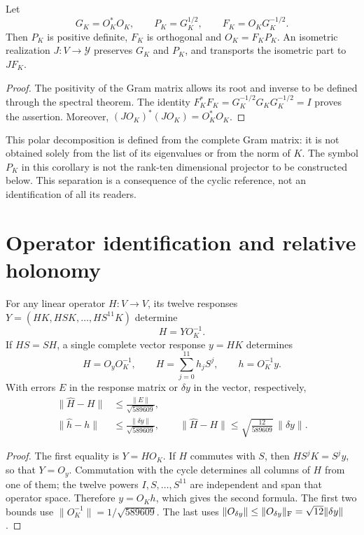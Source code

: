 \begin{corollary}
\label{x_reciprocidad:lib01:polar}
Let
\[
 G_K=O_K^*O_K,\qquad P_K=G_K^{1/2},\qquad
 F_K=O_KG_K^{-1/2}.
\]
Then \(P_K\) is positive definite, \(F_K\) is orthogonal and
\(O_K=F_KP_K\). An isometric realization \(J:V\to\mathcal Y\)
preserves \(G_K\) and \(P_K\), and transports the isometric part to
\(JF_K\).
\end{corollary}
\begin{proof}
The positivity of the Gram matrix allows its root and inverse to be defined through the
spectral theorem. The identity
\(F_K^*F_K=G_K^{-1/2}G_KG_K^{-1/2}=I\) proves the assertion.
Moreover, \((JO_K)^*(JO_K)=O_K^*O_K\).
\end{proof}

This polar decomposition is defined from the complete Gram matrix: it is not obtained solely from the list of its eigenvalues or from the norm of \(K\). The symbol \(P_K\) in this corollary is not the rank-ten dimensional projector to be constructed below. This separation is a consequence of the cyclic reference, not an identification of all its readers.

\section{Operator identification and relative holonomy}
\label{x_reciprocidad:lib01:identificacion}

\begin{theorem}
\label{x_reciprocidad:lib01:operadores}
For any linear operator \(H:V\to V\), its twelve responses \(Y=(HK,HSK,\ldots,HS^{11}K)\) determine
\[
 H=YO_K^{-1}.
\]
If \(HS=SH\), a single complete vector response \(y=HK\)
determines
\begin{equation}
 H=O_yO_K^{-1},\qquad
 H=\sum_{j=0}^{11}h_jS^j,\qquad h=O_K^{-1}y.
 \label{x_reciprocidad:lib01:filtro}
\end{equation}
With errors \(E\) in the response matrix or \(\delta y\) in the vector, respectively,
\begin{align}
 \|\widehat H-H\|&\leq\frac{\|E\|}{\sqrt{589609}},
 \label{x_reciprocidad:lib01:error-matriz}\\
 \|\widehat h-h\|&\leq\frac{\|\delta y\|}{\sqrt{589609}},\qquad
 \|\widehat H-H\|\leq\sqrt{\frac{12}{589609}}\,\|\delta y\|.
 \label{x_reciprocidad:lib01:error-filtro}
\end{align}
\end{theorem}
\begin{proof}
The first equality is \(Y=HO_K\). If \(H\) commutes with \(S\),
then \(HS^jK=S^jy\), so that \(Y=O_y\). Commutation with
the cycle determines all columns of \(H\) from one of them;
the twelve powers \(I,S,\ldots,S^{11}\) are independent and span
that operator space. Therefore \(y=O_Kh\), which gives the
second formula. The first two bounds use
\(\|O_K^{-1}\|=1/\sqrt{589609}\). The last uses
\(\|O_{\delta y}\|\leq\|O_{\delta y}\|_{\rm F}
=\sqrt{12}\|\delta y\|\).
\end{proof}

